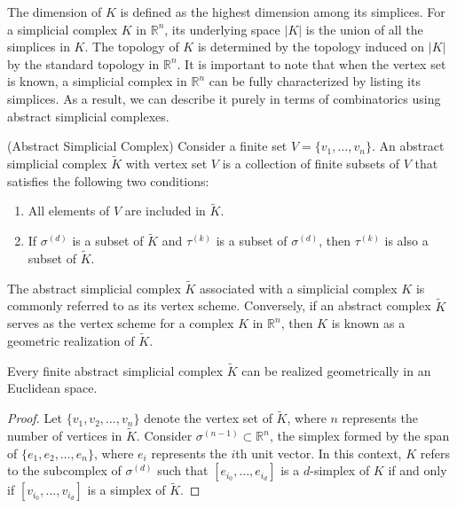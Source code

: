 The dimension of $K$ is defined as the highest dimension among its simplices. For
a simplicial complex $K$ in $\mathbb{R}^{n}$, its underlying space
$\vert K \vert$ is the union of all the simplices in $K$. The topology of $K$ is
determined by the topology induced on $\vert K \vert$ by the standard topology in
$\mathbb{R}^{n}$. It is important to note that when the vertex set is known, a simplicial
complex in $\mathbb{R}^{n}$ can be fully characterized by listing its simplices.
As a result, we can describe it purely in terms of combinatorics using abstract simplicial
complexes.

\begin{definition}
	{(Abstract Simplicial Complex) \cite[§2.3]{boissonnat2018geometric}} \label{abstractsimplicialcomplex}
	Consider a finite set $V = \{v_{1}, \ldots, v_{n}\}$. An abstract simplicial
	complex $\tilde{K}$ with vertex set $V$ is a collection of finite subsets of
	$V$ that satisfies the following two conditions:
	\begin{enumerate}
		\item All elements of $V$ are included in $\tilde{K}$.

		\item If $\sigma^{(d)}$ is a subset of $\tilde{K}$ and $\tau^{(k)}$ is a subset
			of $\sigma^{(d)}$, then $\tau^{(k)}$ is also a subset of $\tilde{K}$.
	\end{enumerate}
\end{definition}

The abstract simplicial complex $\tilde{K}$ associated with a simplicial complex
$K$ is commonly referred to as its vertex scheme. Conversely, if an abstract
complex $\tilde{K}$ serves as the vertex scheme for a complex $K$ in
$\mathbb{R}^{n}$, then $K$ is known as a geometric realization of $\tilde{K}$.

\begin{proposition}
	Every finite abstract simplicial complex $\tilde{K}$ can be realized geometrically
	in an Euclidean space.
\end{proposition}

\begin{proof}
	Let $\{v_{1},v_{2}, \ldots, v_{n}\}$ denote the vertex set of $\tilde{K}$,
	where $n$ represents the number of vertices in $\tilde{K}$. Consider $\sigma^{(n-1)}
	\subset \mathbb{R}^{n}$, the simplex formed by the span of
	$\{e_{1}, e_{2}, \ldots, e_{n}\}$, where $e_{i}$ represents the $i$th unit
	vector. In this context, $K$ refers to the subcomplex of $\sigma^{(d)}$ such
	that $[e_{i_0}, \ldots, e_{i_d}]$ is a $d$-simplex of $K$ if and only if
	$[v_{i_0}, \ldots, v_{i_d}]$ is a simplex of $\tilde{K}$.
\end{proof}

